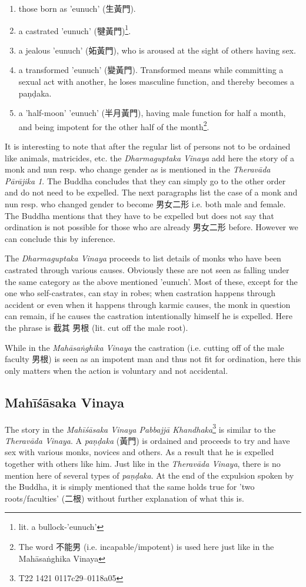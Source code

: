 \begin{enumerate}
\item those born as 'eunuch' (生黃門). 
\item a castrated 'eunuch' (犍黃門)\footnote{lit. a bullock-'eunuch'}.
\item a jealous 'eunuch' (妬黃門), who is aroused at the sight of others having sex.
\item a transformed 'eunuch' (變黃門). Transformed means while committing a sexual act with another, he loses masculine function, and thereby becomes a paṇḍaka.
\item a 'half-moon' 'eunuch' (半月黃門), having male function for half a month, and being impotent for the other half of the month\footnote{The word 不能男 (i.e. incapable/impotent) is used here just like in the Mahāsaṅghika Vinaya}.
\end{enumerate}

It is interesting to note that after the regular list of persons not to be ordained like animals, matricides, etc. the {\em Dharmaguptaka Vinaya} add here the story of a monk and nun resp. who change gender as is mentioned in the {\em Theravāda Pārājika 1}. The Buddha concludes that they can simply go to the other order and do not need to be expelled. The next paragraphs list the case of a monk and nun resp. who changed gender to become 男女二形 i.e. both male and female. The Buddha mentions that they have to be expelled but does not say that ordination is not possible for those who are already 男女二形 before. However we can conclude this by inference.

The {\em Dharmaguptaka Vinaya} proceeds to list details of monks who have been castrated through various causes. Obviously these are not seen as falling under the same category as the above mentioned 'eunuch'. Most of these, except for the one who self-castrates, can stay in robes; when castration happens through accident or even when it happens through karmic causes, the monk in question can remain, if he causes the castration intentionally himself he is expelled. Here the phrase is 截其 男根 (lit. cut off the male root).

While in the {\em Mahāsaṅghika Vinaya} the castration (i.e. cutting off of the male faculty 男根) is seen as an impotent man and thus not fit for ordination, here this only matters when the action is voluntary and not accidental.


\subsection{Mahīśāsaka Vinaya}
The story in the {\em Mahīśāsaka Vinaya Pabbajjā Khandhaka}\footnote{T22 1421 0117c29–0118a05} is similar to the {\em Theravāda Vinaya}. A {\em paṇḍaka} (黃門) is ordained and proceeds to try and have sex with various monks, novices and others. As a result that he is expelled together with others like him. Just like in the {\em Theravāda Vinaya}, there is no mention here of several types of {\em paṇḍaka}. At the end of the expulsion spoken by the Buddha, it is simply mentioned that the same holds true for 'two roots/faculties' (二根) without further explanation of what this is.

